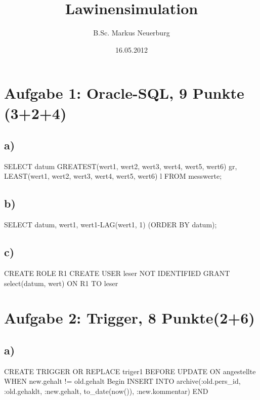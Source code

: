 \documentclass[12pt]{scrreprt}
\title{Lawinensimulation}
\author{B.Sc. Markus Neuerburg}
\date{16.05.2012}
\begin{document}
\section*{Aufgabe 1: Oracle-SQL, 9 Punkte (3+2+4)}
\subsection*{a)}
SELECT datum GREATEST(wert1, wert2, wert3, wert4, wert5, wert6) gr,\newline
\hspace*{5mm}LEAST(wert1, wert2, wert3, wert4, wert5, wert6) l\newline
\hspace*{5mm}FROM messwerte;\newline
\subsection*{b)}
SELECT datum, wert1, wert1-LAG(wert1, 1)\newline
\hspace*{5mm}(ORDER BY datum);\newline
\subsection*{c)}
CREATE ROLE R1\newline
CREATE USER leser NOT IDENTIFIED\newline
GRANT select(datum, wert) ON R1 TO leser\newline

\section*{Aufgabe 2: Trigger, 8 Punkte(2+6)}
\subsection*{a)}
CREATE TRIGGER OR REPLACE triger1\newline
\hspace*{5mm}BEFORE UPDATE ON angestellte\newline
\hspace*{5mm}WHEN new.gehalt != old.gehalt\newline
Begin\newline
\hspace*{5mm}INSERT INTO archive(:old.pers\_id, :old.gehaklt, :new.gehalt, to\_date(now()), :new.kommentar)\newline
END\newline
\end{document}
